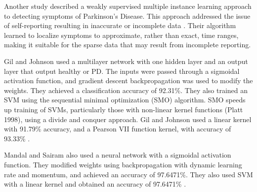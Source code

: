 \documentclass[draftcopy]{srpaper}
\begin{document}
Another study described a weakly supervised multiple instance learning
approach to detecting symptoms of Parkinson’s Disease. This approach
addressed the issue of self-reporting resulting in inaccurate or
incomplete data \cite{DAlTH12}. Their algorithm learned to localize
symptoms to approximate, rather than exact, time ranges, making it
suitable for the sparse data that may result from incomplete reporting.

Gil and Johnson used a multilayer network with one hidden layer
and an output layer that output healthy or PD. The inputs were passed
through a sigmoidal activation function, and gradient descent
backpropagation was used to modify the weights. They achieved a
classification accuracy of 92.31\%.
They also trained an SVM using the sequential minimal
optimization (SMO) algorithm. SMO speeds up training
of SVMs, particularly those with non-linear kernel functions (Platt
1998), using a divide and conquer approach. Gil and Johnson used a
linear kernel with 91.79\% accuracy, and a Pearson VII function
kernel, with accuracy of 93.33\% \cite{GJ70}.

Mandal and Sairam also used a neural network with a sigmoidal activation function. They modified weights using backpropagation with dynamic
learning rate and momentum, and achieved an accuracy of 97.6471\%.
They also used SVM with a linear kernel and obtained an
accuracy of 97.6471\% \cite{MS12}.



\end{document}
